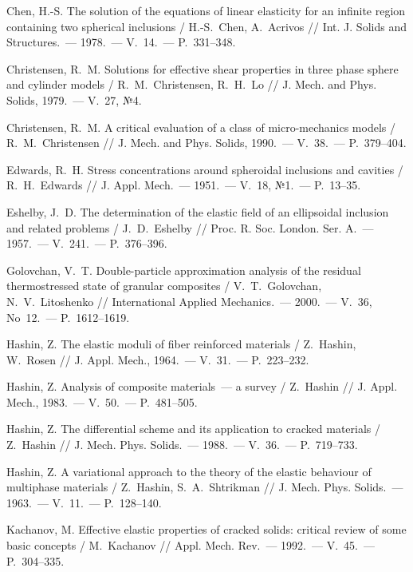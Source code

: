 \begin{russian}
\begin{biblist}{99}
Chen, H.-S. 
The solution of the equations of linear elasticity for an infinite region containing two spherical inclusions 
/ H.-S.~Chen, A.~Acrivos 
// Int. J. Solids and Structures.~--- 1978.~--- V.~14.~--- P.~331--348.

Christensen, R.~M. 
Solutions for effective shear properties in three phase sphere and cylinder models 
/ R.~M.~Christensen, R.~H.~Lo 
// J. Mech. and Phys. Solids, 1979.~--- V.~27, №4.

Christensen, R.~M. 
A critical evaluation of a class of micro-mechanics models 
/ R.~M.~Christensen 
// J. Mech. and Phys. Solids, 1990.~--- V.~38.~--- P.~379--404.

Edwards, R.~H. 
Stress concentrations around spheroidal inclusions and cavities 
/ R.~H.~Edwards 
// J. Appl. Mech.~--- 1951.~--- V.~18, №1.~--- P.~13--35.

Eshelby, J.~D. 
The determination of the elastic field of an ellipsoidal inclusion and related problems  
/ J.~D.~Eshelby 
// Proc. R. Soc. London. Ser. A.~--- 1957.~--- V.~241.~--- P.~376--396.

Golovchan, V.~T. 
Double-particle approximation analysis of the residual thermostressed state of granular composites 
/ V.~T.~Golovchan, N.~V.~Litoshenko 
// International Applied Mechanics.~--- 2000.~--- V.~36, No~12.~--- P.~1612--1619.

Hashin, Z. 
The elastic moduli of fiber reinforced materials 
/ Z.~Hashin, W.~Rosen 
// J. Appl. Mech., 1964.~--- V.~31.~--- P.~223--232.

Hashin, Z. 
Analysis of composite materials~--- a survey 
/ Z.~Hashin 
// J. Appl. Mech., 1983.~--- V.~50.~--- P.~481--505.

Hashin, Z. 
The differential scheme and its application to cracked materials  
/ Z.~Hashin 
// J. Mech. Phys. Solids.~--- 1988.~--- V.~36.~--- P.~719--733.

Hashin, Z. 
A variational approach to the theory of the elastic behaviour of multiphase materials    
/ Z.~Hashin, S.~A.~Shtrikman 
// J. Mech. Phys. Solids.~--- 1963.~--- V.~11.~--- P.~128--140.

Kachanov, M. 
Effective elastic properties of cracked solids: critical review of some basic concepts   
/ M.~Kachanov 
// Appl. Mech. Rev.~--- 1992.~--- V.~45.~--- P.~304--335.


\end{biblist}
\end{russian}
